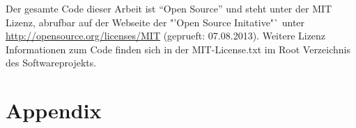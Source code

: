 \documentclass[pagesize, paper=a4, fontsize=12pt,titlepage=true, headings=small, headnosepline, abstractoff, liststotoc, nochapterprefix, plainheadsepline]{scrreprt}
\begin{document}
Der gesamte Code dieser Arbeit ist "`Open Source"' und steht unter der MIT Lizenz, abrufbar auf der Webseite der "'Open Source Initative"` unter \url{http://opensource.org/licenses/MIT} (geprueft: 07.08.2013). Weitere Lizenz Informationen zum Code finden sich in der MIT-License.txt im Root Verzeichnis des Softwareprojekts.



\part*{Appendix}


\lstlistoflistings

\listoftables

\listoffigures

\nocite{*}

\newpage
\end{document}
